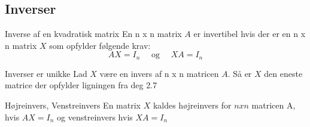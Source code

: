 \documentclass[a4paper,fleqn]{article}
\begin{document}
	\subsection{Inverser}
	\begin{definition}{Inverse af en kvadratisk matrix}{}
		En n x n matrix $A$ er invertibel hvis der er en n x n matrix $X$ som opfylder
		følgende krav: \[AX = I_n \quad \text{ og }\quad XA = I_n\]
	\end{definition}
	\begin{theorem}{Inverser er unikke}{}
		Lad $X$ være en invers af n x n matricen $A$. Så er $X$ den eneste matrice der
		opfylder ligningen fra deg 2.7
	\end{theorem}
	\begin{definition}{Højreinvers, Venstreinvers}
		En matrix $X$ kaldes højreinvers for $n x n$ matricen A, hvis $AX = I_n$ og 
		venstreinvers hvis $XA = I_n$
	\end{definition}
\end{document}
